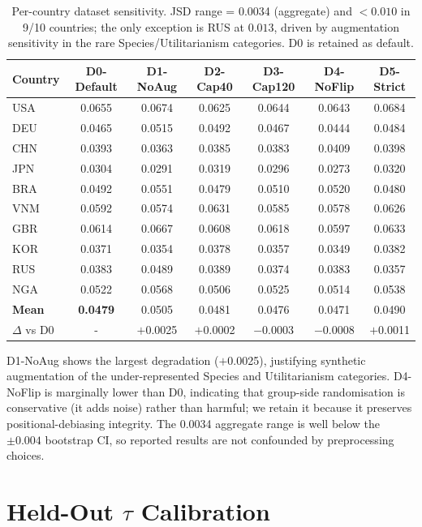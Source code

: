 \documentclass{article}
\begin{document}
\begin{table}[h]\centering\small
\caption{Per-country dataset sensitivity. JSD range = 0.0034 (aggregate) and
$<0.010$ in 9/10 countries; the only exception is RUS at $0.013$, driven by
augmentation sensitivity in the rare Species/Utilitarianism categories.
D0 is retained as default.}
\label{tab:dataset_sens}\scriptsize
\begin{tabular}{lcccccc}\toprule
Country & D0-Default & D1-NoAug & D2-Cap40 & D3-Cap120 & D4-NoFlip & D5-Strict \\\midrule
USA & 0.0655 & 0.0674 & 0.0625 & 0.0644 & 0.0643 & 0.0684 \\
DEU & 0.0465 & 0.0515 & 0.0492 & 0.0467 & 0.0444 & 0.0484 \\
CHN & 0.0393 & 0.0363 & 0.0385 & 0.0383 & 0.0409 & 0.0398 \\
JPN & 0.0304 & 0.0291 & 0.0319 & 0.0296 & 0.0273 & 0.0320 \\
BRA & 0.0492 & 0.0551 & 0.0479 & 0.0510 & 0.0520 & 0.0480 \\
VNM & 0.0592 & 0.0574 & 0.0631 & 0.0585 & 0.0578 & 0.0626 \\
GBR & 0.0614 & 0.0667 & 0.0608 & 0.0618 & 0.0597 & 0.0633 \\
KOR & 0.0371 & 0.0354 & 0.0378 & 0.0357 & 0.0349 & 0.0382 \\
RUS & 0.0383 & 0.0489 & 0.0389 & 0.0374 & 0.0383 & 0.0357 \\
NGA & 0.0522 & 0.0568 & 0.0506 & 0.0525 & 0.0514 & 0.0538 \\\midrule
\textbf{Mean} & \textbf{0.0479} & 0.0505 & 0.0481 & 0.0476 & 0.0471 & 0.0490 \\
$\Delta$ vs D0 & - & $+$0.0025 & $+$0.0002 & $-$0.0003 & $-$0.0008 & $+$0.0011 \\\bottomrule
\end{tabular}
\end{table}

D1-NoAug shows the largest degradation ($+$0.0025), justifying synthetic
augmentation of the under-represented Species and Utilitarianism categories.
D4-NoFlip is marginally lower than D0, indicating that group-side randomisation
is conservative (it adds noise) rather than harmful; we retain it because it
preserves positional-debiasing integrity. The 0.0034 aggregate range is well below
the $\pm0.004$ bootstrap CI, so reported results are not confounded by
preprocessing choices.

\section{Held-Out $\tau$ Calibration}
\label{app:calibration}
\label{app:tau_holdout}
\end{document}
